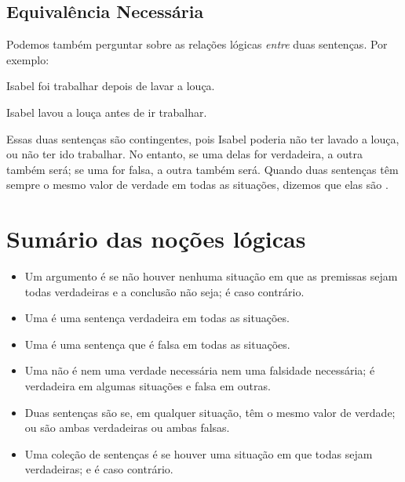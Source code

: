 \subsection{Equivalência Necessária}

Podemos também perguntar sobre as relações lógicas \emph{entre} duas sentenças.
Por exemplo:
\begin{earg}
\item[] Isabel foi trabalhar depois de lavar a louça.
\item[] Isabel lavou a louça antes de ir trabalhar.
\end{earg}
Essas duas sentenças são contingentes, pois Isabel poderia não ter lavado a louça, ou não ter ido trabalhar.
No entanto, se uma delas for verdadeira, a outra também será; se uma for falsa, a outra também será.
Quando duas sentenças têm sempre o mesmo valor de verdade em todas as situações, dizemos que elas são .

\section*{Sumário das noções lógicas}

\begin{itemize}
\item Um argumento é  se não houver nenhuma situação em que as premissas sejam todas verdadeiras e a conclusão não seja; é  caso contrário.

\item Uma  é uma sentença verdadeira em todas as situações.

\item Uma  é uma sentença que é falsa em todas as situações.

\item Uma  não é nem uma verdade necessária nem uma falsidade necessária; é verdadeira em algumas situações e falsa em outras.

\item Duas sentenças são  se, em qualquer situação, têm o mesmo valor de verdade; ou são ambas verdadeiras ou ambas falsas.

\item Uma coleção de sentenças é  se houver uma situação em que todas sejam verdadeiras; e é  caso contrário.
\end{itemize}


